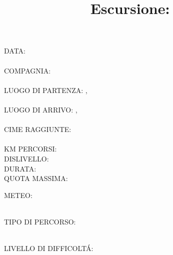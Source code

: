 \documentclass{article}
\title{\Huge Escursione: }
\date{}
\author{}
\begin{document}




\maketitle

\begin{minipage}[t]{0.5\textwidth}
    \faCalendar* DATA: \\
    \\
    \faSmile[regular] COMPAGNIA: \\
    \\
    \faMapPin[regular] LUOGO DI PARTENZA: , \\
    \\
    \faMapPin[regular] LUOGO DI ARRIVO: ,\\
    \\
    \faMountain[regular] CIME RAGGIUNTE:\\
    \vspace*{1cm}\\
    KM PERCORSI: \\
    DISLIVELLO: \\
    DURATA: \\
    QUOTA MASSIMA: \\
\end{minipage} 
\begin{minipage}[t]{0.4\textwidth}
    METEO: \\ \\

    TIPO DI PERCORSO: \\ \\

    LIVELLO DI DIFFICOLT\'A: \\ \\

\end{minipage}
\end{document}
